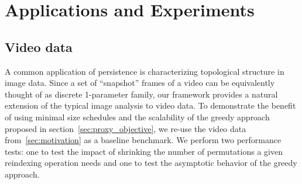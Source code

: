 \documentclass[sn-mathphys]{sn-jnl}
\begin{document}


\section{Applications and Experiments}\label{sec:results}
\subsection{Video data}
A common application of persistence is characterizing topological structure in image data. Since a  set of ``snapshot'' frames of a video can be equivalently thought of as discrete 1-parameter family, our framework provides a natural extension of the typical image analysis to video data. 
To demonstrate the benefit of using minimal size schedules and the scalability of the greedy approach proposed in section~\ref{sec:proxy_objective}, we re-use the video data from~\ref{sec:motivation} as a baseline benchmark. We perform two performance tests: one to test the impact of shrinking the number of permutations a given reindexing operation needs and one to test the asymptotic behavior of the greedy approach. 
\end{document}
